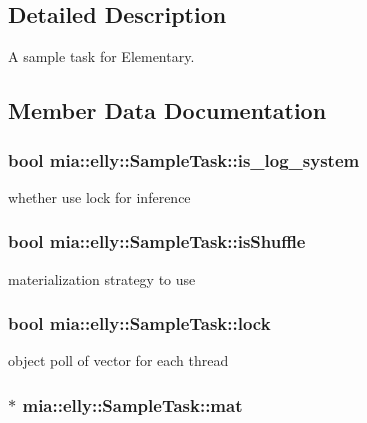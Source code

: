 \subsection{Detailed Description}
A sample task for Elementary. 

\subsection{Member Data Documentation}
\hypertarget{classmia_1_1elly_1_1_sample_task_a04bd3729c1156abd854d947158dfc899}{
\subsubsection[{is\-\_\-log\-\_\-system}]{\setlength{\rightskip}{0pt plus 5cm}bool mia\-::elly\-::\-Sample\-Task\-::is\-\_\-log\-\_\-system}}\label{classmia_1_1elly_1_1_sample_task_a04bd3729c1156abd854d947158dfc899}
whether use lock for inference \hypertarget{classmia_1_1elly_1_1_sample_task_a6d722099cbec603924b6b70b5d68360e}{
\subsubsection[{is\-Shuffle}]{\setlength{\rightskip}{0pt plus 5cm}bool mia\-::elly\-::\-Sample\-Task\-::is\-Shuffle}}\label{classmia_1_1elly_1_1_sample_task_a6d722099cbec603924b6b70b5d68360e}
materialization strategy to use \hypertarget{classmia_1_1elly_1_1_sample_task_a73c4d5c112ff7fe2f998b3a332ad43eb}{
\subsubsection[{lock}]{\setlength{\rightskip}{0pt plus 5cm}bool mia\-::elly\-::\-Sample\-Task\-::lock}}\label{classmia_1_1elly_1_1_sample_task_a73c4d5c112ff7fe2f998b3a332ad43eb}
object poll of vector for each thread \hypertarget{classmia_1_1elly_1_1_sample_task_ad3f4357179b2e6be1edada71febed8de}{
\subsubsection[{mat}]{$\ast$ mia\-::elly\-::\-Sample\-Task\-::mat}}\label{classmia_1_1elly_1_1_sample_task_ad3f4357179b2e6be1edada71febed8de}
